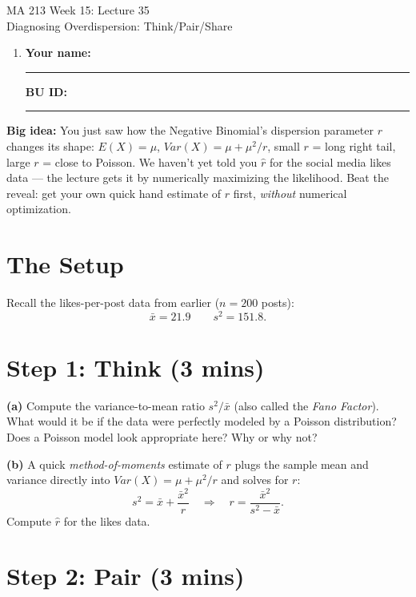 \documentclass{article}
\newcommand{\coursenumber}{MA 213}
\newcommand{\weekplaceholder}{15}
\newcommand{\lectureplaceholder}{35}
\newcommand{\lecturetitle}{Diagnosing Overdispersion: Think/Pair/Share}
\newcommand{\nameblank}{\rule{1.75in}{0.4pt}}
\newcommand{\idblank}{\rule{1.55in}{0.4pt}}
\begin{document}
\begin{center}
  {\LARGE \coursenumber{} Week \weekplaceholder{}: Lecture \lectureplaceholder{}}\\
  {\large \lecturetitle{}}
\end{center}

\begin{enumerate}[label=\arabic*.,leftmargin=*,itemsep=.7em]
  \item \textbf{Your name:} \nameblank \hfill \textbf{BU ID:} \idblank
\end{enumerate}

\textbf{Big idea:} You just saw how the Negative Binomial's dispersion parameter $r$ changes its shape: $E(X)=\mu$, $Var(X) = \mu + \mu^2/r$, small $r$ = long right tail, large $r$ = close to Poisson. We haven't yet told you $\hat r$ for the social media likes data --- the lecture gets it by numerically maximizing the likelihood. Beat the reveal: get your own quick hand estimate of $r$ first, \emph{without} numerical optimization.

\section*{The Setup}

Recall the likes-per-post data from earlier ($n=200$ posts):
\[
\bar{x} = 21.9 \qquad s^2 = 151.8.
\]

\section*{Step 1: Think (3 mins)}

\textbf{(a)} Compute the variance-to-mean ratio $s^2/\bar{x}$ (also called the \emph{Fano Factor}). What would it be if the data were perfectly modeled by a Poisson distribution? Does a Poisson model look appropriate here? Why or why not?
\vspace{0.8in}

\textbf{(b)} A quick \emph{method-of-moments} estimate of $r$ plugs the sample mean and variance directly into $Var(X) = \mu + \mu^2/r$ and solves for $r$:
\[
s^2 = \bar{x} + \frac{\bar{x}^2}{r} \quad\Longrightarrow\quad r = \frac{\bar{x}^2}{s^2 - \bar{x}}.
\]
Compute $\hat{r}$ for the likes data.
\vspace{0.8in}

\newpage
\section*{Step 2: Pair (3 mins)}
\end{document}
